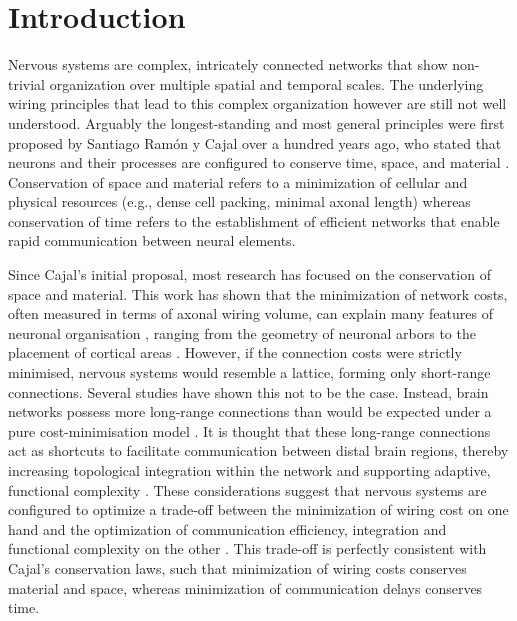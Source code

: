 \section{Introduction}

Nervous systems are complex, intricately connected networks that show non-trivial organization over multiple spatial and temporal scales. The underlying wiring principles that lead to this complex organization however are still not well understood. Arguably the longest-standing and most general principles were first proposed by Santiago Ram\'{o}n y Cajal over a hundred years ago, who stated that neurons and their processes are configured to conserve time, space, and material \citep{RamonyCajal1995}. Conservation of space and material refers to a minimization of cellular and physical resources (e.g., dense cell packing, minimal axonal length) whereas conservation of time refers to the establishment of efficient networks that enable rapid communication between neural elements.

Since Cajal's initial proposal, most research has focused on the conservation of space and material. This work has shown that the minimization of network costs, often measured in terms of axonal wiring volume, can explain many features of neuronal organisation \citep{Cherniak1994,Chklovskii2002,Klyachko2003,Rivera-Alba2011,Wen2005}, ranging from the geometry of neuronal arbors \citep{Cherniak1999} to the placement of cortical areas \citep{Cherniak2004}. However, if the connection costs were strictly minimised, nervous systems would resemble a lattice, forming only short-range connections. Several studies have shown this not to be the case. Instead, brain networks possess more long-range connections than would be expected under a pure cost-minimisation model \citep{Bassett2006,Bullmore2012,Kaiser2006}. It is thought that these long-range connections act as shortcuts to facilitate communication between distal brain regions, thereby increasing topological integration within the network \citep{Bullmore2012,Buzsaki2004a,VandenHeuvel2012} and supporting adaptive, functional complexity \citep{Betzel2018}. These considerations suggest that nervous systems are configured to optimize a trade-off between the minimization of wiring cost on one hand and the optimization of communication efficiency, integration and functional complexity on the other \citep{Bullmore2012}. This trade-off is perfectly consistent with Cajal's conservation laws, such that minimization of wiring costs conserves material and space, whereas minimization of communication delays conserves time.

